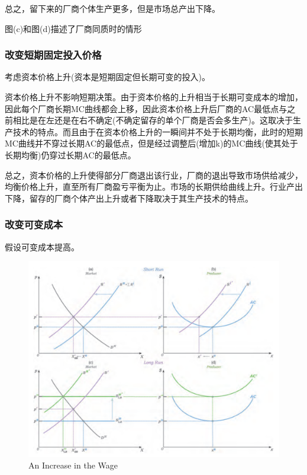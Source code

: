 \documentclass{article}
\begin{document}
总之，留下来的厂商个体生产更多，但是市场总产出下降。

图(c)和图(d)描述了厂商同质时的情形

\subsubsection{改变短期固定投入价格}

考虑资本价格上升(资本是短期固定但长期可变的投入)。

资本价格上升不影响短期决策。由于资本价格的上升相当于长期可变成本的增加，因此每个厂商长期MC曲线都会上移，因此资本价格上升后厂商的AC最低点与之前相比是在左还是在右不确定(不确定留存的单个厂商是否会多生产)。这取决于生产技术的特点。而且由于在资本价格上升的一瞬间并不处于长期均衡，此时的短期MC曲线并不穿过长期AC的最低点，但是经过调整后(增加k)的MC曲线(使其处于长期均衡)仍穿过长期AC的最低点。

总之，资本价格的上升使得部分厂商退出该行业，厂商的退出导致市场供给减少，均衡价格上升，直至所有厂商盈亏平衡为止。市场的长期供给曲线上升。行业产出下降，留存的厂商个体产出上升或者下降取决于其生产技术的特点。

\subsubsection{改变可变成本}

假设可变成本提高。

\begin{figure}[H] %
	\centering %
	\includegraphics[width=1\textwidth]{14_5} %
	\caption{An Increase in the Wage} %
	\label{Fig.main6} %
\end{figure}
\end{document}
